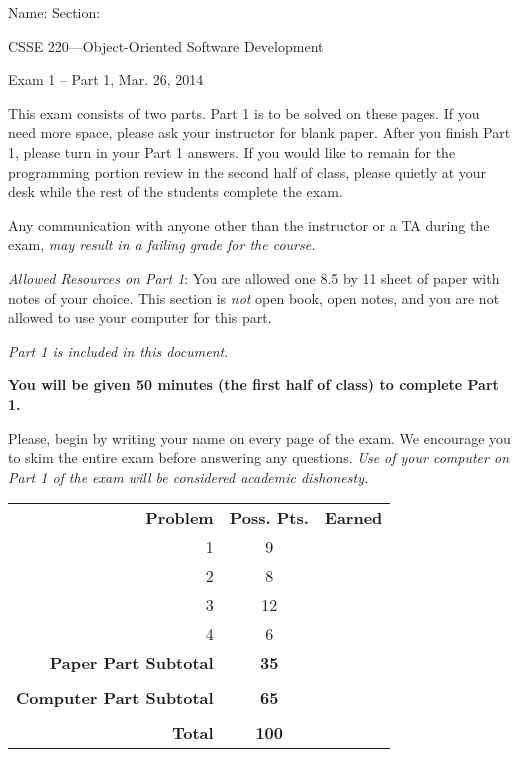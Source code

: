 \documentclass[12pt,twoside]{article}
\newcommand{\fillInBlank}[1][0.5in]{\underline{\hspace{#1}}}
\begin{document}

\begin{flushright}
Name: \fillInBlank[3in] Section: \fillInBlank[1in]

\LARGE{CSSE 220---Object-Oriented Software Development}

\Large{Exam 1 -- Part 1, Mar. 26, 2014}
\end{flushright}

This exam consists of two parts.  Part 1 is to be solved on these pages. If you need more space, please ask your instructor for blank paper.  After you finish Part 1, please turn in your Part 1 answers. If you would like to remain for the programming portion review in the second half of class, please quietly at your desk while the rest of the students complete the exam.

Any communication with anyone other than the instructor or a TA during the exam, \emph{may result in a failing grade for the course.}

\emph{Allowed Resources on Part 1}:  You are allowed one 8.5 by 11 sheet of paper with notes of your choice.  This section is \emph{not} open book, open notes, and you are not allowed to use your computer for this part.  

\emph{Part 1 is included in this document}.  

\begin{center}
\textbf{You will be given 50 minutes (the first half of class) to complete Part 1.}
\end{center}

Please, begin by writing your name on every page of the exam. We encourage you to skim the
entire exam before answering any questions. \emph{Use of your computer on Part 1 of the exam will be considered academic dishonesty.}


\vfill

\begin{flushright}
\begin{tabular}{rcc}
\textbf{Problem} & \textbf{Poss. Pts.} & \textbf{Earned} \\
1 & 9 & \fillInBlank \\
2 & 8 & \fillInBlank \\
3 & 12 & \fillInBlank \\
4 & 6 & \fillInBlank \\
\textbf{Paper Part Subtotal} & \textbf{35} & \fillInBlank\\
 & & \\
\textbf{Computer Part Subtotal} & \textbf{65} & \fillInBlank\\
 & & \\
\textbf{Total} & \textbf{100} & \fillInBlank
\end{tabular}
\end{flushright}
\clearpage
\end{document}
